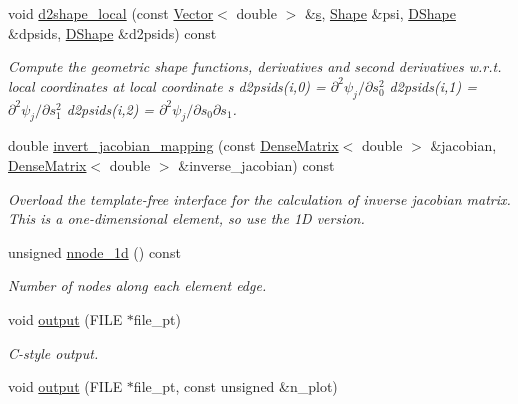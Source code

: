 \begin{DoxyCompactItemize}
void \hyperlink{classoomph_1_1QSpectralElement_3_012_00_01NNODE__1D_01_4_aaf4f353bb9b3ff1f475b4940c8f0c5d6}{d2shape\+\_\+local} (const \hyperlink{classoomph_1_1Vector}{Vector}$<$ double $>$ \&\hyperlink{cfortran_8h_ab7123126e4885ef647dd9c6e3807a21c}{s}, \hyperlink{classoomph_1_1Shape}{Shape} \&psi, \hyperlink{classoomph_1_1DShape}{D\+Shape} \&dpsids, \hyperlink{classoomph_1_1DShape}{D\+Shape} \&d2psids) const
\begin{DoxyCompactList}\small\item\em Compute the geometric shape functions, derivatives and second derivatives w.\+r.\+t. local coordinates at local coordinate s d2psids(i,0) = $ \partial ^2 \psi_j / \partial s_0^2 $ d2psids(i,1) = $ \partial ^2 \psi_j / \partial s_1^2 $ d2psids(i,2) = $ \partial ^2 \psi_j / \partial s_0 \partial s_1 $. \end{DoxyCompactList}\item 
double \hyperlink{classoomph_1_1QSpectralElement_3_012_00_01NNODE__1D_01_4_a43e9825330e5e7c107a78a14fcace34d}{invert\+\_\+jacobian\+\_\+mapping} (const \hyperlink{classoomph_1_1DenseMatrix}{Dense\+Matrix}$<$ double $>$ \&jacobian, \hyperlink{classoomph_1_1DenseMatrix}{Dense\+Matrix}$<$ double $>$ \&inverse\+\_\+jacobian) const
\begin{DoxyCompactList}\small\item\em Overload the template-\/free interface for the calculation of inverse jacobian matrix. This is a one-\/dimensional element, so use the 1D version. \end{DoxyCompactList}\item 
unsigned \hyperlink{classoomph_1_1QSpectralElement_3_012_00_01NNODE__1D_01_4_abb8c11e648023e4eb3e4af30a220725e}{nnode\+\_\+1d} () const
\begin{DoxyCompactList}\small\item\em Number of nodes along each element edge. \end{DoxyCompactList}\item 
void \hyperlink{classoomph_1_1QSpectralElement_3_012_00_01NNODE__1D_01_4_a0d1c4c3b40af9d7cbb9922e688bd57ec}{output} (F\+I\+LE $\ast$file\+\_\+pt)
\begin{DoxyCompactList}\small\item\em C-\/style output. \end{DoxyCompactList}\item 
void \hyperlink{classoomph_1_1QSpectralElement_3_012_00_01NNODE__1D_01_4_a129604057f0fc189c83421d96988eb41}{output} (F\+I\+LE $\ast$file\+\_\+pt, const unsigned \&n\+\_\+plot)

\end{DoxyCompactItemize}

